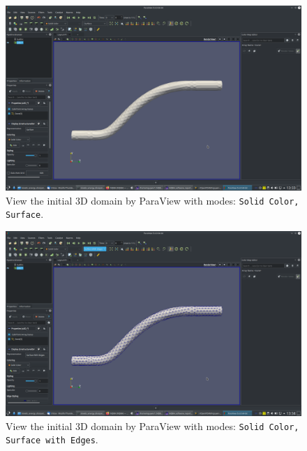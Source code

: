 \documentclass[onsided]{book}
\numberwithin{equation}{section}
\begin{document}
\begin{enumerate}
\begin{enumerate}
        \begin{figure}[H]
            \centering
            \includegraphics[height=0.44\textheight]{initial_domain_3D_Solid_Color_Surface}
            \caption{View the initial 3D domain by ParaView with modes: \texttt{Solid Color, Surface}.}
        \end{figure}
        
        \begin{figure}[H]
            \centering
            \includegraphics[height=0.44\textheight]{initial_domain_3D_Solid_Color_Surface_with_Edges}
            \caption{View the initial 3D domain by ParaView with modes: \texttt{Solid Color, Surface with Edges}.}
        \end{figure}
    

\end{enumerate}
\end{enumerate}
\end{document}
